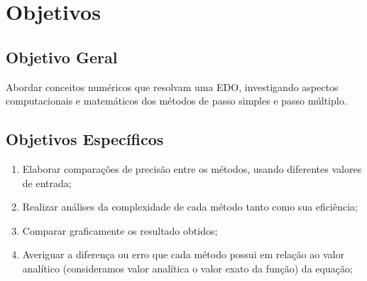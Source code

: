 \section{Objetivos}\label{lobjetivos}
\subsection{Objetivo Geral}
Abordar conceitos numéricos que resolvam uma EDO, investigando aspectos 
computacionais e matemáticos dos métodos de passo simples e passo múltiplo.
\subsection{Objetivos Específicos}
\begin{enumerate}[label=\roman*.]
\item Elaborar comparações de precisão entre os métodos, usando diferentes valores de entrada;
\item Realizar análises da complexidade de cada método tanto como sua eficiência;
\item Comparar graficamente os resultado obtidos;
\item Averiguar a diferença ou erro que cada método possui em relação ao valor analítico (consideramos valor analítica o valor exato da função) da equação;
\end{enumerate}

